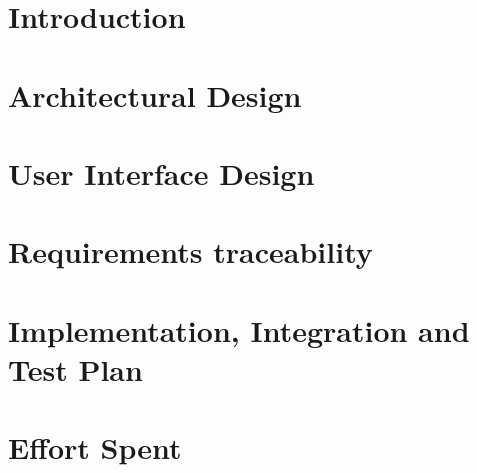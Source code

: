 \documentclass[table, 12pt]{article}
\begin{document}
\clearpage
{{\section{Introduction}}}
\label{sect:introduction}

\clearpage
{{\section{Architectural Design}}}
\label{sect:architectural}

\clearpage
{{\section{User Interface Design}}}
\label{sect:interface}

\clearpage
{{\section{Requirements traceability}}}
\label{sect:requirements_traceability}

\clearpage
{{\section{Implementation, Integration and Test Plan}}}
\label{sect:implementation}

\clearpage
{{\section{Effort Spent}}}
\label{sect:effort}

\end{document}
